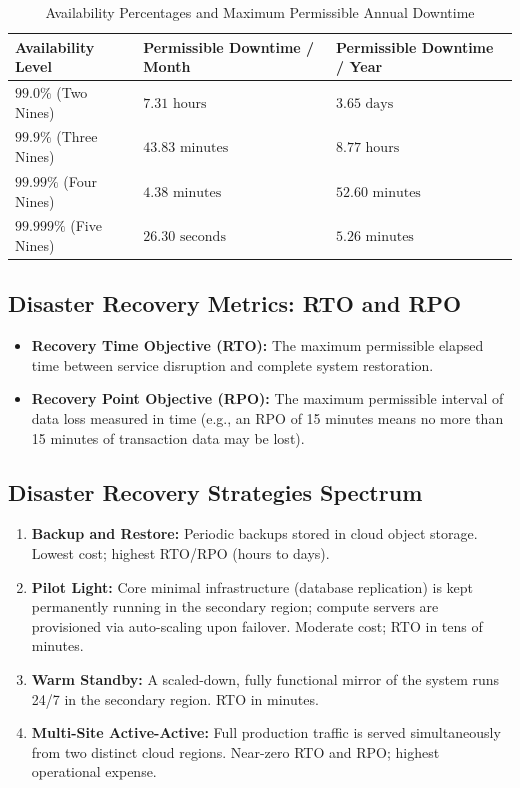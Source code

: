 \begin{table}[htbp]
\centering
\small
\caption{Availability Percentages and Maximum Permissible Annual Downtime}
\label{tab:sla_downtime_table}
\begin{tabularx}{\textwidth}{lXX}
\toprule
\textbf{Availability Level} & \textbf{Permissible Downtime / Month} & \textbf{Permissible Downtime / Year} \\
\midrule
$99.0\%$ (Two Nines) & $7.31\text{ hours}$ & $3.65\text{ days}$ \\
$99.9\%$ (Three Nines) & $43.83\text{ minutes}$ & $8.77\text{ hours}$ \\
$99.99\%$ (Four Nines) & $4.38\text{ minutes}$ & $52.60\text{ minutes}$ \\
$99.999\%$ (Five Nines) & $26.30\text{ seconds}$ & $5.26\text{ minutes}$ \\
\bottomrule
\end{tabularx}
\end{table}

\subsection{Disaster Recovery Metrics: RTO and RPO}
\begin{itemize}
    \item \textbf{Recovery Time Objective (RTO):} The maximum permissible elapsed time between service disruption and complete system restoration.
    \item \textbf{Recovery Point Objective (RPO):} The maximum permissible interval of data loss measured in time (e.g., an RPO of 15 minutes means no more than 15 minutes of transaction data may be lost).
\end{itemize}

\subsection{Disaster Recovery Strategies Spectrum}
\begin{enumerate}
    \item \textbf{Backup and Restore:} Periodic backups stored in cloud object storage. Lowest cost; highest RTO/RPO (hours to days).
    \item \textbf{Pilot Light:} Core minimal infrastructure (database replication) is kept permanently running in the secondary region; compute servers are provisioned via auto-scaling upon failover. Moderate cost; RTO in tens of minutes.
    \item \textbf{Warm Standby:} A scaled-down, fully functional mirror of the system runs 24/7 in the secondary region. RTO in minutes.
    \item \textbf{Multi-Site Active-Active:} Full production traffic is served simultaneously from two distinct cloud regions. Near-zero RTO and RPO; highest operational expense.
\end{enumerate}



